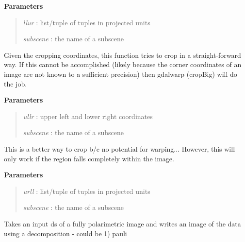 \documentclass[letterpaper,10pt,openany,oneside]{sphinxmanual}
\begin{document}
\begin{fulllineitems}
\begin{fulllineitems}
\textbf{Parameters}
\begin{quote}

\emph{llur}     : list/tuple of tuples in projected units

\emph{subscene} : the name of a subscene
\end{quote}

\end{fulllineitems}


\begin{fulllineitems}
\label{code:Image.Image.cropImg}
Given the cropping coordinates, this function tries to crop in a straight-forward way.
If this cannot be accomplished (likely because the corner coordinates of an image are not known to a sufficient precision)
then gdalwarp (cropBig) will do the job.

\textbf{Parameters}
\begin{quote}

\emph{ullr}     : upper left and lower right coordinates

\emph{subscene} : the name of a subscene
\end{quote}

\end{fulllineitems}


\begin{fulllineitems}
\label{code:Image.Image.cropSmall}
This is a better way to crop b/c no potential for warping...
However, this will only work if the region falls completely within the image.

\textbf{Parameters}
\begin{quote}

\emph{urll}     : list/tuple of tuples in projected units

\emph{subscene} : the name of a subscene
\end{quote}

\end{fulllineitems}


\begin{fulllineitems}
\label{code:Image.Image.decomp}
Takes an input ds of a fully polarimetric image and writes an image of
the data using a decomposition - could be 1) pauli


\end{fulllineitems}
\end{fulllineitems}
\end{document}
